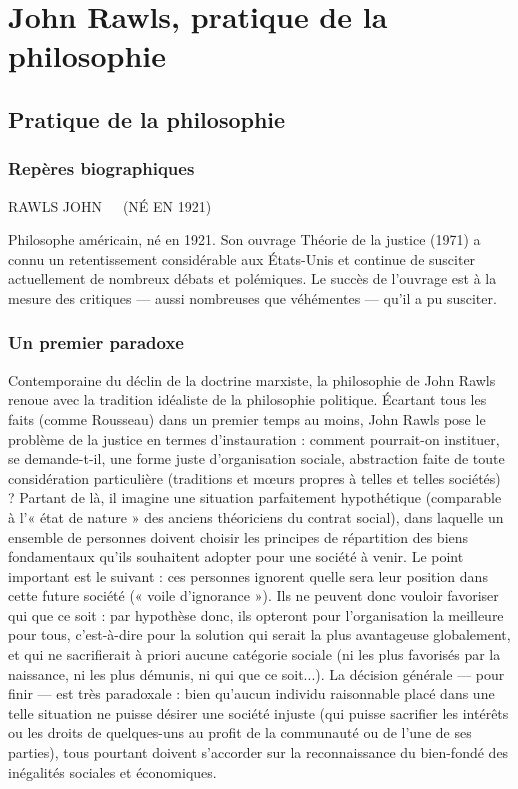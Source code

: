 
\chapter{John Rawls, pratique de la philosophie}

\section{Pratique de la philosophie}

\subsection{Repères biographiques}

RAWLS JOHN\ \ \ (NÉ EN 1921)

\vspace{0.25cm}
Philosophe américain, né en 1921.
Son ouvrage Théorie de la justice
(1971) a connu un retentissement
%
considérable aux États-Unis et continue de susciter actuellement de
nombreux débats et polémiques. Le
succès de l'ouvrage est à la mesure
des critiques — aussi nombreuses
que véhémentes — qu'il a pu susciter.

{\it }


\subsection{Un premier paradoxe}

Contemporaine du déclin de la doctrine
marxiste, la philosophie de John Rawls
renoue avec la tradition idéaliste de la
philosophie politique. Écartant tous les
faits (comme Rousseau) dans un premier temps au moins, John Rawls pose
le problème de la justice en termes
d'instauration : comment pourrait-on
instituer, se demande-t-il, une forme
juste d'organisation sociale, abstraction
faite de toute considération particulière
(traditions et mœurs propres à telles et
telles sociétés) ? Partant de là, il imagine
une situation parfaitement hypothétique
(comparable à l’« état de nature » des
anciens théoriciens du contrat social),
dans laquelle un ensemble de personnes
doivent choisir les principes de répartition des biens fondamentaux qu'ils
souhaitent adopter pour une société à
venir. Le point important est le suivant :
ces personnes ignorent quelle sera leur
position dans cette future société (« voile
d’ignorance »). Ils ne peuvent donc vouloir favoriser qui que ce soit :
 par hypothèse donc, ils opteront pour l’organisation la meilleure pour tous, c'est-à-dire
pour la solution qui serait la plus avantageuse globalement, et qui ne sacrifierait à priori aucune catégorie sociale (ni
les plus favorisés par la naissance, ni les
plus démunis, ni qui que ce soit...). La
décision générale — pour finir — est
très paradoxale : bien qu'aucun individu
raisonnable placé dans une telle situation ne puisse désirer une société injuste
(qui puisse sacrifier les intérêts ou les
droits de quelques-uns au profit de la
communauté ou de l’une de ses parties),
tous pourtant doivent s’accorder sur la
reconnaissance du bien-fondé des inégalités sociales et économiques.


